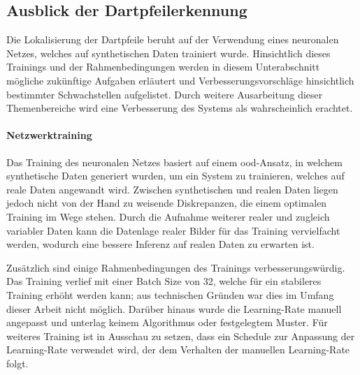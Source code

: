 

\subsection{Ausblick der Dartpfeilerkennung}
\label{sec:ausblick_ki}

Die Lokalisierung der Dartpfeile beruht auf der Verwendung eines neuronalen Netzes, welches auf synthetischen Daten trainiert wurde. Hinsichtlich dieses Trainings und der Rahmenbedingungen werden in diesem Unterabschnitt mögliche zukünftige Aufgaben erläutert und Verbesserungsvorschläge hinsichtlich bestimmter Schwachstellen aufgelistet. Durch weitere Ausarbeitung dieser Themenbereiche wird eine Verbesserung des Systems als wahrscheinlich erachtet.

\paragraph{Netzwerktraining}

Das Training des neuronalen Netzes basiert auf einem \ac{ood}-Ansatz, in welchem synthetische Daten generiert wurden, um ein System zu trainieren, welches auf reale Daten angewandt wird. Zwischen synthetischen und realen Daten liegen jedoch nicht von der Hand zu weisende Diskrepanzen, die einem optimalen Training im Wege stehen. Durch die Aufnahme weiterer realer und zugleich variabler Daten kann die Datenlage realer Bilder für das Training vervielfacht werden, wodurch eine bessere Inferenz auf realen Daten zu erwarten ist.

Zusätzlich sind einige Rahmenbedingungen des Trainings verbesserungswürdig. Das Training verlief mit einer Batch Size von 32, welche für ein stabileres Training erhöht werden kann; aus technischen Gründen war dies im Umfang dieser Arbeit nicht möglich. Darüber hinaus wurde die Learning-Rate manuell angepasst und unterlag keinem Algorithmus oder festgelegtem Muster. Für weiteres Training ist in Ausschau zu setzen, dass ein Schedule zur Anpassung der Learning-Rate verwendet wird, der dem Verhalten der manuellen Learning-Rate folgt.



